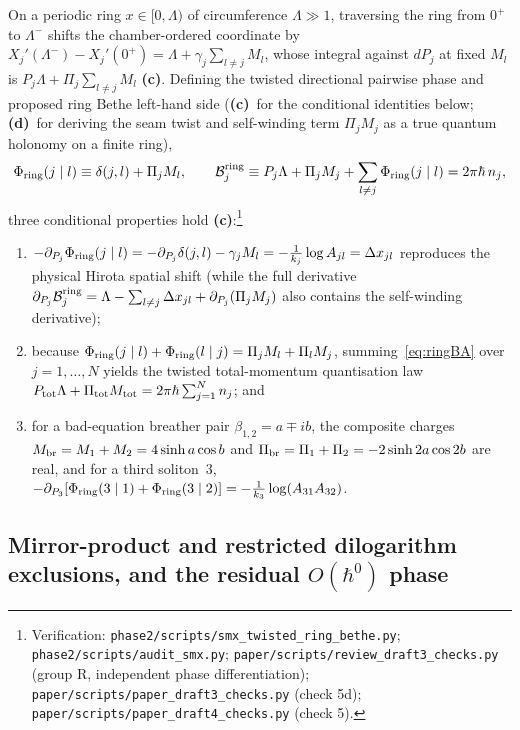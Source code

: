 \documentclass[11pt,a4paper]{article}
\newcommand{\lab}[1]{{\normalfont\sffamily\footnotesize\bfseries(#1)}}
\newcommand{\Lc}{\lab{c}}
\newcommand{\Ld}{\lab{d}}
\newcommand{\scr}[1]{\nolinkurl{#1}}
\newcommand{\chk}[1]{\footnote{\raggedright Verification: #1.}}
\newcommand{\hb}{\hbar}
\theoremstyle{remark}
\begin{document}
On a periodic ring $x\in[0,\Lambda)$ of circumference $\Lambda\gg1$, traversing the ring from $0^+$ to $\Lambda^-$ shifts the chamber-ordered coordinate by $X_j'(\Lambda^-)-X_j'(0^+)=\Lambda+\gamma_j\sum_{l\neq j}M_l$, whose integral against $dP_j$ at fixed $M_l$ is $P_j\Lambda+\Pi_j\sum_{l\neq j}M_l$ \Lc. Defining the twisted directional pairwise phase and proposed ring Bethe left-hand side (\Lc\ for the conditional identities below; \Ld\ for deriving the seam twist and self-winding term $\Pi_jM_j$ as a true quantum holonomy on a finite ring),
\begin{equation}\label{eq:ringBA}
\Phi_{\rm ring}(j\mid l)\equiv\delta(j,l)+\Pi_jM_l,\qquad
\mathcal B_j^{\rm ring}\equiv P_j\Lambda+\Pi_jM_j+\sum_{l\neq j}\Phi_{\rm ring}(j\mid l)=2\pi\hb\,n_j,
\end{equation}
three conditional properties hold \Lc:\chk{\scr{phase2/scripts/smx_twisted_ring_bethe.py}; \scr{phase2/scripts/audit_smx.py}; \scr{paper/scripts/review_draft3_checks.py} (group R, independent phase differentiation); \scr{paper/scripts/paper_draft3_checks.py} (check 5d); \scr{paper/scripts/paper_draft4_checks.py} (check 5)}
\begin{enumerate}
\item $-\partial_{P_j}\Phi_{\rm ring}(j\mid l)=-\partial_{P_j}\delta(j,l)-\gamma_jM_l=-\frac1{k_j}\log A_{jl}=\Delta x_{jl}$ reproduces the physical Hirota spatial shift (while the full derivative $\partial_{P_j}\mathcal B_j^{\rm ring}=\Lambda-\sum_{l\neq j}\Delta x_{jl}+\partial_{P_j}(\Pi_jM_j)$ also contains the self-winding derivative);
\item because $\Phi_{\rm ring}(j\mid l)+\Phi_{\rm ring}(l\mid j)=\Pi_jM_l+\Pi_lM_j$, summing~\eqref{eq:ringBA} over $j=1,\dots,N$ yields the twisted total-momentum quantisation law $P_{\rm tot}\Lambda+\Pi_{\rm tot}M_{\rm tot}=2\pi\hb\sum_{j=1}^Nn_j$; and
\item for a bad-equation breather pair $\beta_{1,2}=a\mp ib$, the composite charges $M_{\rm br}=M_1+M_2=4\sinh a\cos b$ and $\Pi_{\rm br}=\Pi_1+\Pi_2=-2\sinh2a\cos2b$ are real, and for a third soliton~3, $-\partial_{P_3}[\Phi_{\rm ring}(3\mid1)+\Phi_{\rm ring}(3\mid2)]=-\frac1{k_3}\log(A_{31}A_{32})$.
\end{enumerate}

\subsection{Mirror-product and restricted dilogarithm exclusions, and the residual \texorpdfstring{$O(\hb^0)$}{O(hbar\^0)} phase}\label{sec:exclusions}
\end{document}
